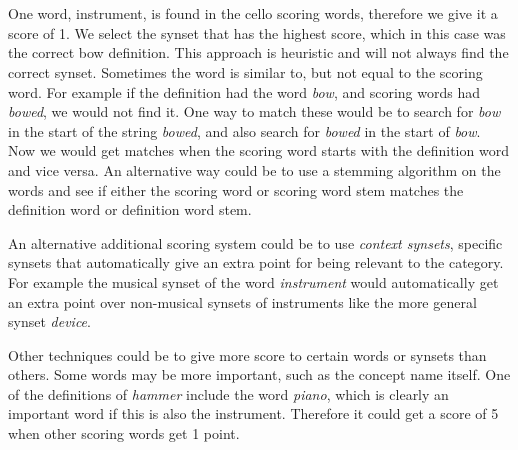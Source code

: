 \noindent{}
\\\\One word, instrument, is found in the cello scoring words, therefore we give it a score of 1. We select the synset that has the highest score, which in this case was the correct bow definition. This approach is heuristic and will not always find the correct synset.
Sometimes the word is similar to, but not equal to the scoring word. For example if the definition had the word \emph{bow}, and scoring words had \emph{bowed}, we would not find it. One way to match these would be to search for \emph{bow} in the start of the string \emph{bowed}, and also search for \emph{bowed} in the start of \emph{bow}. Now we would get matches when the scoring word starts with the definition word and vice versa. An alternative way could be to use a stemming algorithm on the words and see if either the scoring word or scoring word stem matches the definition word or definition word stem.

An alternative additional scoring system could be to use \emph{context synsets}, specific synsets that automatically give an extra point for being relevant to the category. For example the musical synset of the word \emph{instrument} would automatically get an extra point over non-musical synsets of instruments like the more general synset \emph{device}.

Other techniques could be to give more score to certain words or synsets than others. Some words may be more important, such as the concept name itself. One of the definitions of \emph{hammer} include the word \emph{piano}, which is clearly an important word if this is also the instrument. Therefore it could get a score of 5 when other scoring words get 1 point.


